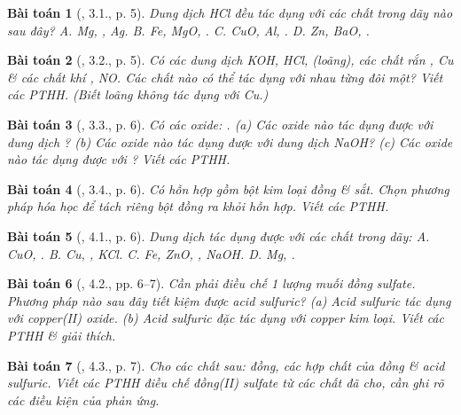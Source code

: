 \documentclass{article}
\newtheorem{baitoan}{Bài toán}
\begin{document}
\begin{baitoan}[\cite{SBT_Hoa_Hoc_9}, 3.1., p. 5]
	Dung dịch \emph{HCl} đều tác dụng với các chất trong dãy nào sau đây? {\sf A.} \emph{Mg, , Ag}. {\sf B.} \emph{Fe, MgO, }. {\sf C.} \emph{CuO, Al, }. {\sf D.} \emph{Zn, BaO, }.
\end{baitoan}

\begin{baitoan}[\cite{SBT_Hoa_Hoc_9}, 3.2., p. 5]
	Có các dung dịch \emph{KOH, HCl, } (loãng), các chất rắn \emph{, Cu} \& các chất khí \emph{, NO}. Các chất nào có thể tác dụng với nhau từng đôi một? Viết các PTHH. (Biết \emph{} loãng không tác dụng với \emph{Cu}.)
\end{baitoan}

\begin{baitoan}[\cite{SBT_Hoa_Hoc_9}, 3.3., p. 6]
	Có các oxide: \emph{}. (a) Các oxide nào tác dụng được với dung dịch \emph{}? (b) Các oxide nào tác dụng được với dung dịch \emph{NaOH}? (c) Các oxide nào tác dụng được với \emph{}? Viết các PTHH.
\end{baitoan}

\begin{baitoan}[\cite{SBT_Hoa_Hoc_9}, 3.4., p. 6]
	Có hỗn hợp gồm bột kim loại đồng \& sắt. Chọn phương pháp hóa học để tách riêng bột đồng ra khỏi hỗn hợp. Viết các PTHH.
\end{baitoan}

\begin{baitoan}[\cite{SBT_Hoa_Hoc_9}, 4.1., p. 6]
	Dung dịch \emph{} tác dụng được với các chất trong dãy: {\sf A.} \emph{CuO, }. {\sf B.} \emph{Cu, , KCl}. {\sf C.} \emph{Fe, ZnO, , NaOH}. {\sf D.} \emph{Mg, }.
\end{baitoan}

\begin{baitoan}[\cite{SBT_Hoa_Hoc_9}, 4.2., pp. 6--7]
	Cần phải điều chế 1 lượng muối đồng sulfate. Phương pháp nào sau đây tiết kiệm được acid sulfuric? (a) Acid sulfuric tác dụng với copper(II) oxide. (b) Acid sulfuric đặc tác dụng với copper kim loại. Viết các PTHH \& giải thích.
\end{baitoan}

\begin{baitoan}[\cite{SBT_Hoa_Hoc_9}, 4.3., p. 7]
	Cho các chất sau: đồng, các hợp chất của đồng \& acid sulfuric. Viết các PTHH điều chế đồng(II) sulfate từ các chất đã cho, cần ghi rõ các điều kiện của phản ứng.
\end{baitoan}
\end{document}
